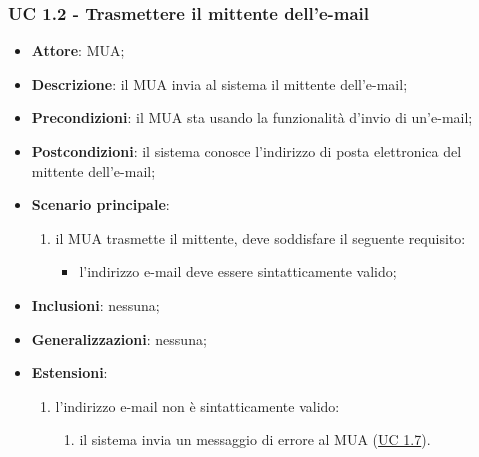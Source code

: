     \subsubsection{UC 1.2 - Trasmettere il mittente dell'e-mail} \label{sec:UC1.2}
    \begin{itemize}
        \item \textbf{Attore}: MUA;
        \item \textbf{Descrizione}: il MUA invia al sistema il mittente dell'e-mail;
        \item \textbf{Precondizioni}: il MUA sta usando la funzionalità d'invio di un'e-mail;
        \item \textbf{Postcondizioni}: il sistema conosce l'indirizzo di posta elettronica del mittente dell'e-mail;
        \item \textbf{Scenario principale}:
            \begin{enumerate}
                \item il MUA trasmette il mittente, deve soddisfare il seguente requisito:
                    \begin{itemize}
                        \item l'indirizzo e-mail deve essere sintatticamente valido;
                    \end{itemize}
            \end{enumerate}
        \item \textbf{Inclusioni}: nessuna;
        \item \textbf{Generalizzazioni}: nessuna;
        \item \textbf{Estensioni}:
            \begin{enumerate}[label=\alph*.]
                \item l'indirizzo e-mail non è sintatticamente valido:
                \begin{enumerate}[label=\arabic*.]
                    \item il sistema invia un messaggio di errore al MUA (\hyperref[sec:UC1.7]{UC 1.7}).
                \end{enumerate}
            \end{enumerate}
    \end{itemize}

